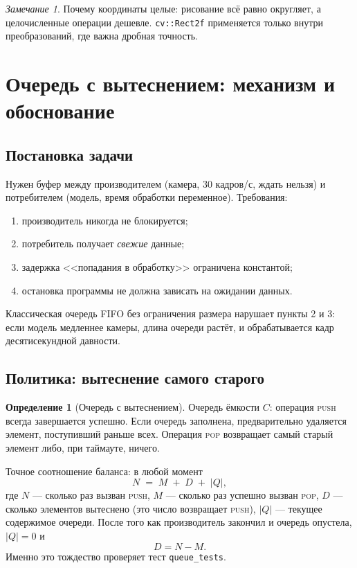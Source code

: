 \documentclass[11pt,a4paper]{article}
\theoremstyle{definition}
\newtheorem{definition}{Определение}[section]
\theoremstyle{remark}
\newtheorem*{remark}{Замечание}
\begin{document}
\begin{remark}
Почему координаты целые: рисование всё равно округляет, а целочисленные
операции дешевле. \texttt{cv::Rect2f} применяется только внутри
преобразований, где важна дробная точность.
\end{remark}

\section{Очередь с вытеснением: механизм и обоснование}

\subsection{Постановка задачи}

Нужен буфер между производителем (камера, 30 кадров/с, ждать нельзя) и
потребителем (модель, время обработки переменное). Требования:

\begin{enumerate}
  \item производитель никогда не блокируется;
  \item потребитель получает \emph{свежие} данные;
  \item задержка <<попадания в обработку>> ограничена константой;
  \item остановка программы не должна зависать на ожидании данных.
\end{enumerate}

Классическая очередь FIFO без ограничения размера нарушает пункты 2 и 3:
если модель медленнее камеры, длина очереди растёт, и обрабатывается кадр
десятисекундной давности.

\subsection{Политика: вытеснение самого старого}

\begin{definition}[Очередь с вытеснением]
Очередь ёмкости $C$: операция \textsc{push} всегда завершается успешно. Если
очередь заполнена, предварительно удаляется элемент, поступивший раньше всех.
Операция \textsc{pop} возвращает самый старый элемент либо, при таймауте, ничего.
\end{definition}

Точное соотношение баланса: в любой момент
\[
  N \;=\; M \;+\; D \;+\; |Q|,
\]
где $N$ --- сколько раз вызван \textsc{push}, $M$ --- сколько раз успешно
вызван \textsc{pop}, $D$ --- сколько элементов вытеснено (это число возвращает
\textsc{push}), $|Q|$ --- текущее содержимое очереди. После того как
производитель закончил и очередь опустела, $|Q| = 0$ и
\[
  D = N - M .
\]
Именно это тождество проверяет тест \texttt{queue\_tests}.
\end{document}
